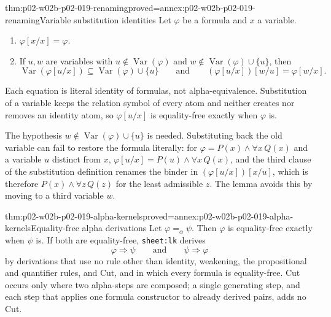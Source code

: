 \begin{hblemma}{thm:p02-w02b-p02-019-renaming}{proved=annex:p02-w02b-p02-019-renaming}{Variable substitution identities}
Let \(\varphi\) be a formula and \(x\) a variable.
\begin{enumerate}
 \item \(\varphi[x/x]=\varphi\).
 \item If \(u,w\) are variables with \(u\notin\operatorname{Var}(\varphi)\)
   and \(w\notin\operatorname{Var}(\varphi)\cup\{u\}\), then
   \[
    \operatorname{Var}(\varphi[u/x])\subseteq\operatorname{Var}(\varphi)\cup\{u\}
    \qquad\text{and}\qquad
    (\varphi[u/x])[w/u]=\varphi[w/x].
   \]
\end{enumerate}
Each equation is literal identity of formulas, not alpha-equivalence.
Substitution of a variable keeps the relation symbol of every atom and
neither creates nor removes an identity atom, so \(\varphi[u/x]\) is equality-free exactly when
\(\varphi\) is.
\end{hblemma}

The hypothesis \(w\notin\operatorname{Var}(\varphi)\cup\{u\}\) is needed.
Substituting back the old variable can fail to restore the formula
literally: for \(\varphi=P(x)\land\forall x\,Q(x)\) and a variable \(u\)
distinct from \(x\), \(\varphi[u/x]=P(u)\land\forall x\,Q(x)\), and the
third clause of the substitution definition renames the binder in
\((\varphi[u/x])[x/u]\), which is therefore
\(P(x)\land\forall z\,Q(z)\) for the least admissible \(z\).  The lemma
avoids this by moving to a third variable \(w\).

\begin{hblemma}{thm:p02-w02b-p02-019-alpha-kernels}{proved=annex:p02-w02b-p02-019-alpha-kernels}{Equality-free alpha derivations}
Let \(\varphi=_{\alpha}\psi\).  Then \(\varphi\) is equality-free exactly
when \(\psi\) is.  If both are equality-free, \texttt{sheet:lk} derives
\[
 \varphi\Rightarrow\psi
 \qquad\text{and}\qquad
 \psi\Rightarrow\varphi
\]
by derivations that use no rule other than identity, weakening, the
propositional and quantifier rules, and Cut, and in which every formula is
equality-free.  Cut occurs only where two alpha-steps are composed; a single
generating step, and each step that applies one formula constructor to
already derived pairs, adds no Cut.
\end{hblemma}

